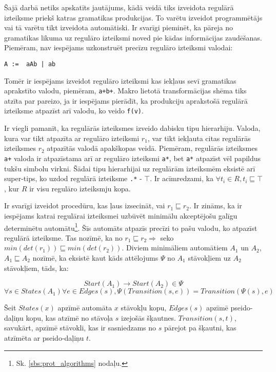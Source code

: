 Šajā darbā netiks apskatīts jautājums, kādā veidā tiks izveidota regulārā izteiksme priekš katras gramatikas produkcijas. To varētu izveidot programmētājs vai tā varētu tikt izveidota automātiski. Ir svarīgi pieminēt, ka pāreja no gramatikas likuma uz regulāro izteiksmi noved pie kādas informācijas zaudēšanas. Piemēram, nav iespējams uzkonstruēt precīzu regulāro izteiksmi valodai:

\begin{verbatim}
A :=  aAb | ab
\end{verbatim}

Tomēr ir iespējams izveidot regulāro izteiksmi kas iekļaus sevī gramatikas aprakstīto valodu, piemēram, \verb|a+b+|. Makro lietotā transformācijas shēma tiks atzīta par pareizo, ja ir iespējams pierādīt, ka produkciju aprakstošā regulārā izteiksme atpazīst arī valodu, ko veido \verb|f(v)|.

Ir viegli pamanīt, ka regulārās izteiksmes izveido dabisku tipu hierarhiju. Valoda, kura var tikt atpazīta ar regulāro izteiksmi $r_1$, var tikt iekļauta citas regulārās izteiksmes $r_2$ atpazītās valodā apakškopas veidā. Piemēram, regulārās izteiksmes \verb|a+| valoda ir atpazīstama arī ar regulāro izteiksmi \verb|a*|, bet \verb|a*| atpazīst vēl papildus tukšu simbolu virkni. Šādai tipu hierarhijai uz regulārām izteiksmēm eksistē arī super-tips, ko uzdod regulārā izteiksme \verb|.*| - $\top$. Ir acīmredzami, ka $\forall t_i \in R, t_i \sqsubseteq \top$, kur $R$ ir visu regulāro izteiksmju kopa.

Ir svarīgi izveidot procedūru, kas ļaus izsecināt, vai $r_1 {\sqsubseteq} r_2$. Ir zināms, ka ir iespējams katrai regulārai izteiksmei uzbūvēt minimālu akceptējošu galīgu determinētu automātu\footnote{Sk. \ref{sbs:prot_algorithms} nodaļu.}. Šīs automāts atpazīs precīzi to pašu valodu, ko atpazīst regulārā izteiksme. Tas nozīmē, ka no $r_1 \sqsubseteq r_2 \Rightarrow$ seko $min(det (r_1)) \sqsubseteq min (det (r_2))$. Diviem minimāliem automātiem $A_1$ un $A_2$, $A_1 \sqsubseteq A_2$ nozīmē, ka eksistē kaut kāds attēlojums $\Psi$ no $A_1$ stāvokļiem uz $A_2$ stāvokļiem, tāds, ka:

\[
    Start (A_1) \to Start (A_2) \in \Psi
\]
\[
    \forall s \in States (A_1) \forall e \in Edges (s),
    \Psi (Transition (s, e)) = Transition (\Psi (s), e)
\]

Šeit $States (x)$ apzīmē automāta $x$ stāvokļu kopu, $Edges (s)$ apzīmē pseido-daļiņu kopu, kas atzīmē no stāvoļa $s$ izejošās šķautnes. $Transition(s, t)$, savukārt, apzīmē stāvokli, kas ir sasniedzams no $s$ pārejot pa šķautni, kas atzīmēta ar pseido-daļiņu $t$.

